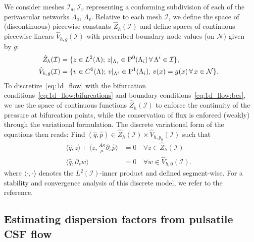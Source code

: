 \documentclass[fleqn,10pt]{wlscirep}
\begin{document}
We consider meshes $\mathcal{I}_a, \mathcal{I}_v$ representing a
conforming subdivision of each of the perivascular networks
$\Lambda_a$, $\Lambda_v$. Relative to each mesh $\mathcal{I}$, we define the
space of (discontinuous) piecewise constants $\hat{Z}_h(\mathcal{I})$ and define
spaces of continuous piecewise linears $\hat{V}_{h, g}(\mathcal{I})$ with
prescribed boundary node values (on $\mathcal{N}$) given by $g$:
\begin{align}
  \hat{Z}_h(\mathcal{I}) &= \{z \in L^2(\Lambda) ; \, z \vert_{\Lambda_i} \in \mathrm{P}^{0}(\Lambda_i) \, \forall \, \Lambda^i \in \mathcal{I}\}, \\
  \hat{V}_{h, g}(\mathcal{I}) &= \{ v \in C^0(\Lambda) ; \, v \vert_{\Lambda^i} \in \mathrm{P}^1(\Lambda_i), \, v(x) = g(x) \, \forall \, x \in \mathcal{N} \} .
\end{align}
To discretize~\eqref{eq:1d_flow} with the bifurcation
conditions~\eqref{eq:1d_flow:bifurcations} and boundary
conditions~\eqref{eq:1d_flow:bcs}, we use the space of continuous
functions $\hat{Z}_h(\mathcal{I})$ to enforce the continuity of the pressure at
bifurcation points, while the conservation of flux is enforced
(weakly) through the variational formulation. The discrete variational form of the equations then reads: Find $(\hat{q}, \hat{p}) \in \hat{Z}_h(\mathcal{I}) \times \hat{V}_{h, p_0}(\mathcal{I})$ such that
\begin{subequations}
\begin{align}
  \langle \hat{q}, z \rangle +  \langle z, \frac{A \kappa}{\mu} \partial_s \hat{p}  \rangle &= 0 \quad \forall z \in \hat{Z}_h(\mathcal{I}) \\
  \langle \hat{q}, \partial_s w \rangle &= 0 \quad  \forall w \in \hat{V}_{h, 0}(\mathcal{I}).
\end{align}
\end{subequations}%
where $\langle \cdot, \cdot \rangle$ denotes the $L^2(\mathcal{I})$-inner product and defined segment-wise. For a stability and convergence analysis of this discrete model, we refer to the reference\cite{gjerde2024directional}. 

\subsection{Estimating dispersion factors from pulsatile CSF flow}
\label{sec:app:dispersion}
\end{document}
